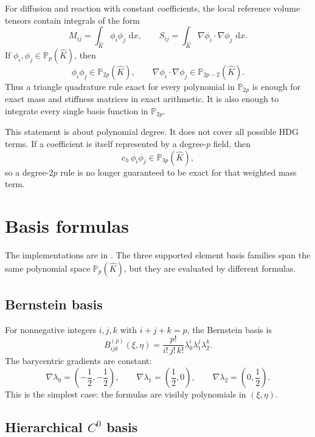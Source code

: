 \documentclass[11pt]{article}
\newcommand{\code}[1]{\texttt{\detokenize{#1}}}
\newcommand{\Phat}{\mathbb P}
\newcommand{\Khat}{\widehat K}
\newcommand{\dd}{\,\mathrm d}
\newcommand{\grad}{\nabla}
\newcommand{\lam}{\lambda}
\begin{document}
For diffusion and reaction with constant coefficients, the local reference
volume tensors contain integrals of the form
\[
  M_{ij} = \int_{\Khat} \phi_i\phi_j\,\dd x,
  \qquad
  S_{ij} = \int_{\Khat} \grad\phi_i\cdot\grad\phi_j\,\dd x.
\]
If \(\phi_i,\phi_j\in\Phat_p(\Khat)\), then
\[
  \phi_i\phi_j\in\Phat_{2p}(\Khat),
  \qquad
  \grad\phi_i\cdot\grad\phi_j\in\Phat_{2p-2}(\Khat).
\]
Thus a triangle quadrature rule exact for every polynomial in
\(\Phat_{2p}\) is enough for exact mass and stiffness matrices in exact
arithmetic.  It is also enough to integrate every single basis function in
\(\Phat_{2p}\).

This statement is about polynomial degree.  It does not cover all possible HDG
terms.  If a coefficient is itself represented by a degree-\(p\) field, then
\[
  c_h\,\phi_i\phi_j \in \Phat_{3p}(\Khat),
\]
so a degree-\(2p\) rule is no longer guaranteed to be exact for that weighted
mass term.

\section{Basis formulas}

The implementations are in \code{hybridge/core/basis.py}.  The three supported
element basis families span the same polynomial space \(\Phat_p(\Khat)\), but
they are evaluated by different formulas.

\subsection{Bernstein basis}

For nonnegative integers \(i,j,k\) with \(i+j+k=p\), the Bernstein basis is
\[
  B_{ijk}^{(p)}(\xi,\eta)
  =
  \frac{p!}{i!\,j!\,k!}
  \lam_0^i\lam_1^j\lam_2^k.
\]
The barycentric gradients are constant:
\[
  \grad\lam_0=\left(-\frac12,-\frac12\right),\qquad
  \grad\lam_1=\left(\frac12,0\right),\qquad
  \grad\lam_2=\left(0,\frac12\right).
\]
This is the simplest case: the formulas are visibly polynomials in
\((\xi,\eta)\).

\subsection{\texorpdfstring{Hierarchical \(C^0\) basis}{Hierarchical C0 basis}}
\end{document}
